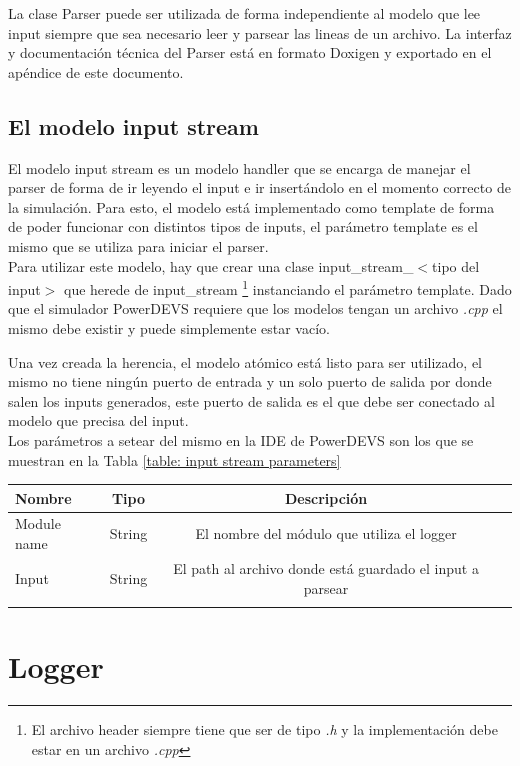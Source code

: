 \documentclass[10pt,a4paper]{article}
\begin{document}
La clase Parser puede ser utilizada de forma independiente al modelo que lee input siempre que sea necesario leer y parsear las lineas de un archivo. La interfaz y documentación técnica del Parser está en formato Doxigen y exportado en el apéndice de este documento.

\subsection{El modelo input stream}

El modelo input stream es un modelo handler que se encarga de manejar el parser de forma de ir leyendo el input e ir insertándolo en el momento correcto de la simulación. Para esto, el modelo está implementado como template de forma de poder funcionar con distintos tipos de inputs, el parámetro template es el mismo que se utiliza para iniciar el parser. \\

Para utilizar este modelo, hay que crear una clase input\_stream\_$<$tipo del input$>$ que herede de input\_stream \footnote{El archivo header siempre tiene que ser de tipo \textit{.h} y la implementación debe estar en un archivo \textit{.cpp}} instanciando el parámetro template. Dado que el simulador PowerDEVS requiere que los modelos tengan un archivo \textit{.cpp} el mismo debe existir y puede simplemente estar vacío.

Una vez creada la herencia, el modelo atómico está listo para ser utilizado, el mismo no tiene ningún puerto de entrada y un solo puerto de salida por donde salen los inputs generados, este puerto de salida es el que debe ser conectado al modelo que precisa del input. \\

Los parámetros a setear del mismo en la IDE de PowerDEVS son los que se muestran en la Tabla \ref{table: input stream parameters}

\begin{tabular}{|l|c|c|c|}
  \hline
  Nombre & Tipo & Descripción \\
  \hline
  Module name & String & El nombre del módulo que utiliza el logger \\
  \hline
  Input & String & El path al archivo donde está guardado el input a parsear \\
  \hline
  \label{table: input stream parameters}
  \caption{Parametros del modelo input\_stream}
\end{tabular}

\section{Logger}
\end{document}
